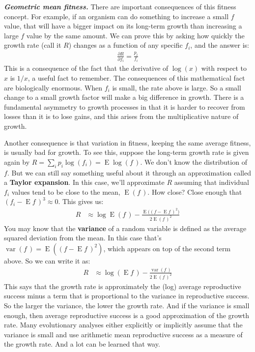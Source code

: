 \documentclass[10pt,reqno]{amsbook}
\DeclareMathOperator{\var}{var}
\DeclareMathOperator{\E}{E}
\newcommand{\bemph}[1]{{\textbf{\textcolor{bemphcol}{#1}}}}
\numberwithin{equation}{chapter}
\newenvironment{mathboxmp}[1]
{\begin{tcolorbox}[breakable, enhanced, oversize]\footnotesize\noindent\textbf{\emph{#1}}}
{\end{tcolorbox}}
\begin{document}
\begin{mathboxmp}{Geometric mean fitness.}
There are important consequences of this fitness concept. For example, if an organism can do something to increase a small $f$ value, that will have a bigger impact on its long-term growth than increasing a large $f$ value by the same amount. We can prove this by asking how quickly the growth rate (call it $R$) changes as a function of any specific $f_i$, and the answer is:
\begin{align*}
	\frac{\partial R}{\partial f_i} = \frac{p_i}{f_i}
\end{align*}
This is a consequence of the fact that the derivative of $\log(x)$ with respect to $x$ is $1/x$, a useful fact to remember. The consequences of this mathematical fact are biologically enormous. When $f_i$ is small, the rate above is large. So a small change to a small growth factor will make a big difference in growth. There is a fundamental asymmetry to growth processes in that it is harder to recover from losses than it is to lose gains, and this arises from the multiplicative nature of growth.

Another consequence is that variation in fitness, keeping the same average fitness, is usually bad for growth. To see this, suppose the long-term growth rate is given again by 
$R = \sum_i p_i \log(f_i) = \E \log(f\,)$. 
We don't know the distribution of $f$. But we can still say something useful about it through an approximation called a \bemph{Taylor expansion}. In this case, we'll approximate $R$ assuming that individual $f_i$ values tend to be close to the mean, $\E(f\,)$. How close? Close enough that $(f_i - \E f\,)^3 \approx 0$. This gives us:
\begin{align*}
	R &\approx \log \E ( f \,) - \frac{\E \! \big((f-\E f\,)^{\!2} \big)}{2 \E(f\,)^{\!2}}
\end{align*}
You may know that the \bemph{variance} of a random variable is defined as the average squared deviation from the mean. In this case that's $\var(f\,)=\E((f - \E f\,)^2)$, which appears on top of the second term above. So we can write it as:
\begin{align*}
	R &\approx \log(\E f \,) - \frac{\var(f\,)}{2 \E(f\,)^{\!2}}
\end{align*}
This says that the growth rate is approximately the (log) average reproductive success minus a term that is proportional to the variance in reproductive success. So the larger the variance, the lower the growth rate. And if the variance is small enough, then average reproductive success is a good approximation of the growth rate. Many evolutionary analyses either explicitly or implicitly assume that the variance is small and use arithmetic mean reproductive success as a measure of the growth rate. And a lot can be learned that way. 


\end{mathboxmp}
\end{document}

